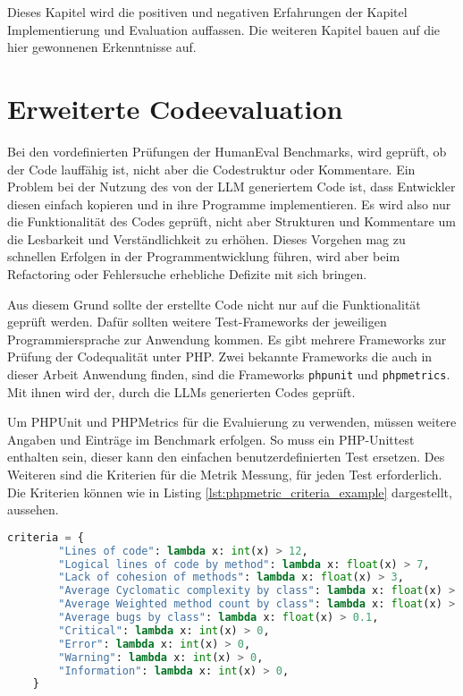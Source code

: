 \begin{tcolorbox}[
	enhanced,
	colback=red!5!white,
	colframe=red!75!black!50,
	title= Mein roter Faden
	]
Dieses Kapitel wird die positiven und negativen Erfahrungen der Kapitel Implementierung und Evaluation auffassen. Die weiteren Kapitel bauen auf die hier gewonnenen Erkenntnisse auf.
\end{tcolorbox}


\section{Erweiterte Codeevaluation}
Bei den vordefinierten Prüfungen der HumanEval Benchmarks, wird geprüft, ob der Code lauffähig ist, nicht aber die Codestruktur oder Kommentare. Ein Problem bei der Nutzung des von der LLM generiertem Code ist, dass Entwickler diesen einfach kopieren und in ihre Programme implementieren. Es wird also nur die Funktionalität des Codes geprüft, nicht aber Strukturen und Kommentare um die Lesbarkeit und Verständlichkeit zu erhöhen. Dieses Vorgehen mag zu schnellen Erfolgen in der Programmentwicklung führen, wird aber beim Refactoring oder Fehlersuche erhebliche Defizite mit sich bringen.\vspace{0.2cm}

Aus diesem Grund sollte der erstellte Code nicht nur auf die Funktionalität geprüft werden. Dafür sollten weitere Test-Frameworks der jeweiligen Programmiersprache zur Anwendung kommen. Es gibt mehrere Frameworks zur Prüfung der Codequalität unter PHP. Zwei bekannte Frameworks die auch in dieser Arbeit Anwendung finden, sind die Frameworks \texttt{phpunit} und \texttt{phpmetrics}. Mit ihnen wird der, durch die LLMs generierten Codes geprüft.\vspace{0.2cm}

Um PHPUnit und PHPMetrics für die Evaluierung zu verwenden, müssen weitere Angaben und Einträge im Benchmark erfolgen. So muss ein PHP-Unittest enthalten sein, dieser kann den einfachen benutzerdefinierten Test ersetzen. Des Weiteren sind die Kriterien für die Metrik Messung, für jeden Test erforderlich. Die Kriterien können wie in Listing \ref{lst:phpmetric_criteria_example} dargestellt, aussehen.

\begin{lstlisting}[language=python,caption={Beispiel für Bewertungskriterien},label=lst:phpmetric_criteria_example]
	criteria = {
		"Lines of code": lambda x: int(x) > 12,
		"Logical lines of code by method": lambda x: float(x) > 7,
		"Lack of cohesion of methods": lambda x: float(x) > 3,
		"Average Cyclomatic complexity by class": lambda x: float(x) > 10,
		"Average Weighted method count by class": lambda x: float(x) > 20,
		"Average bugs by class": lambda x: float(x) > 0.1,
		"Critical": lambda x: int(x) > 0,
		"Error": lambda x: int(x) > 0,
		"Warning": lambda x: int(x) > 0,
		"Information": lambda x: int(x) > 0,
	}
\end{lstlisting}


